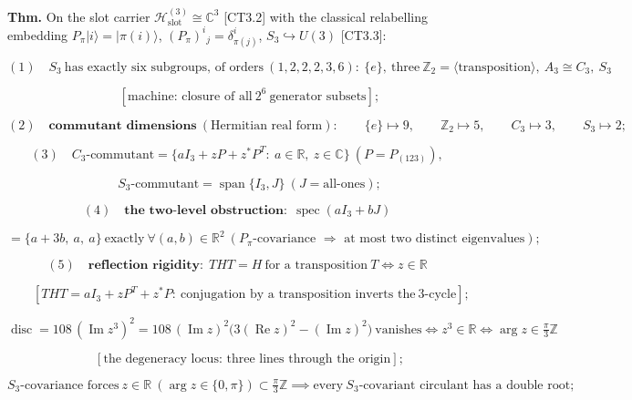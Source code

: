 \begin{theorem}\label{tag:FT-116}
\textbf{Thm.} On the slot carrier $\mathcal H^{(3)}_{\mathrm{slot}}\cong\mathbb C^3$ [CT3.2] with the classical relabelling embedding $P_\pi|i\rangle=|\pi(i)\rangle$, $(P_\pi)^i{}_j=\delta^i_{\pi(j)}$, $S_3\hookrightarrow U(3)$ [CT3.3]:

\[
(1)\quad S_3\ \text{has exactly six subgroups, of orders}\ (1,2,2,2,3,6):\ \{e\},\ \text{three}\ \mathbb Z_2=\langle\text{transposition}\rangle,\ A_3\cong C_3,\ S_3
\]

\[
\qquad [\text{machine: closure of all}\ 2^6\ \text{generator subsets}];
\]

\[
(2)\quad\textbf{commutant dimensions}\ (\text{Hermitian real form}):\qquad\{e\}\mapsto9,\qquad\mathbb Z_2\mapsto5,\qquad C_3\mapsto3,\qquad S_3\mapsto2;
\]

\[
(3)\quad C_3\text{-commutant}=\{aI_3+zP+z^{*}P^{T}:\ a\in\mathbb R,\ z\in\mathbb C\}\ (P=P_{(123)}),
\]

\[
\qquad S_3\text{-commutant}=\operatorname{span}\{I_3,J\}\ (J=\text{all-ones});
\]

\[
(4)\quad\textbf{the two-level obstruction:}\ \ \operatorname{spec}(aI_3+bJ)
\]

\[
= \{a+3b,\ a,\ a\}\ \text{exactly}\ \forall(a,b)\in\mathbb R^2\ (P_\pi\text{-covariance }\Rightarrow\text{ at most two distinct eigenvalues});
\]

\[
(5)\quad\textbf{reflection rigidity:}\ \ THT=H\ \text{for a transposition}\ T\iff z\in\mathbb R
\]

\[
\qquad [THT=aI_3+zP^{T}+z^{*}P:\ \text{conjugation by a transposition inverts the}\ 3\text{-cycle}];
\]

\[
\operatorname{disc}=108\,(\operatorname{Im}z^3)^2=108\,(\operatorname{Im}z)^2\bigl(3(\operatorname{Re}z)^2-(\operatorname{Im}z)^2\bigr)\ \text{vanishes}\iff z^3\in\mathbb R\iff\arg z\in\tfrac\pi3\mathbb Z
\]

\[
\qquad [\text{the degeneracy locus: three lines through the origin}];
\]

\[
S_3\text{-covariance forces}\ z\in\mathbb R\ (\arg z\in\{0,\pi\})\subset\tfrac\pi3\mathbb Z\implies\text{every}\ S_3\text{-covariant circulant has a double root};
\]


\end{theorem}
